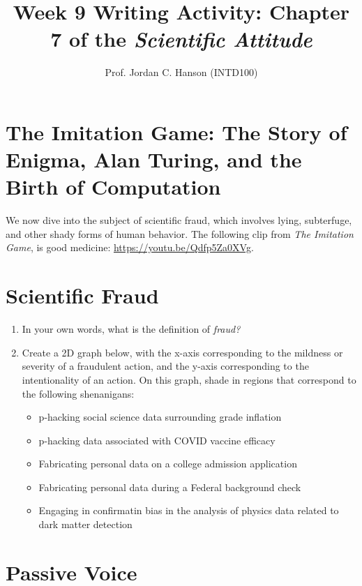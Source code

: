 \documentclass{article}
\begin{document}
\title{Week 9 Writing Activity: Chapter 7 of the \textit{Scientific Attitude}}
\author{Prof. Jordan C. Hanson (INTD100)}

\maketitle

\section{The Imitation Game: The Story of Enigma, Alan Turing, and the Birth of Computation}

We now dive into the subject of scientific fraud, which involves lying, subterfuge, and other shady forms of human behavior.  The following clip from \textit{The Imitation Game}, is good medicine: \url{https://youtu.be/Qdfp5Za0XVg}.

\section{Scientific Fraud}

\begin{enumerate}
\item In your own words, what is the definition of \textit{fraud?} \\ \vspace{1cm}
\item Create a 2D graph below, with the x-axis corresponding to the mildness or severity of a fraudulent action, and the y-axis corresponding to the intentionality of an action.  On this graph, shade in regions that correspond to the following shenanigans:
\begin{itemize}
\item p-hacking social science data surrounding grade inflation
\item p-hacking data associated with COVID vaccine efficacy
\item Fabricating personal data on a college admission application
\item Fabricating personal data during a Federal background check
\item Engaging in confirmatin bias in the analysis of physics data related to dark matter detection
\end{itemize} \vspace{4cm}
\end{enumerate}

\section{Passive Voice}
\end{document}
